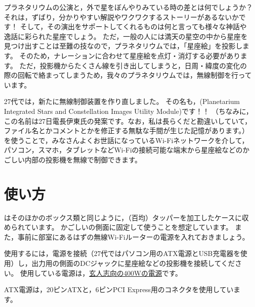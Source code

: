 \documentclass[letterpaper,10pt,dvipdfmx]{sphinxmanual}
\begin{document}
プラネタリウムの公演と，外で星をぼんやりみている時の差とは何でしょうか？
それは，ずばり，分かりやすい解説やワクワクするストーリーがあるないかです！
そして，その演出をサポートしてくれるものは何と言っても様々な神話や逸話に彩られた星座でしょう。
ただ，一般の人には満天の星空の中から星座を見つけ出すことは至難の技なので，プラネタリウムでは，「星座絵」を投影します。
そのため，ナレーションに合わせて星座絵を点灯・消灯する必要があります。
ただ，投影機からたくさん線を引き出してしまうと，日周・緯度の変化の際の回転で絡まってしまうため，我々のプラネタリウムでは，無線制御を行っています。

27代では，新たに無線制御装置を作り直しました。
その名も，(Planetarium Integrated Stars and Constellation
Images Utility Module)です！！
（ちなみに，この名前は27日電長伊東氏の発案です。なお，私は長らくだと勘違いしていて，ファイル名とかコメントとかを修正する無駄な手間が生じた記憶があります。）
を使うことで，みなさんよくお世話になっているWi-Fiネットワークを介して，パソコン，スマホ，タブレットなどWi-Fiの接続可能な端末から星座絵などのかごしい内部の投影機を無線で制御できます。


\section{使い方}
\label{\detokenize{wireless/piscium:id2}}
はそのほかのボックス類と同じように，（百均）タッパーを加工したケースに収められています。
かごしいの側面に固定して使うことを想定しています。
また，事前に部室にあるはずの無線Wi-Fiルーターの電源を入れておきましょう。
\begin{figure}[htbp]
\centering

\noindent{}
\end{figure}

使用するには，電源を接続（27代ではパソコン用のATX電源とUSB充電器を使用）し，出力用の側面のDCジャックに星座絵などの投影機を接続してください。
使用している電源は，\href{http://www.kuroutoshikou.com/product/power/atx/krpw-l5-400w\_80\_/}{玄人志向の400Wの電源}です。
\begin{figure}[htbp]
\centering

\noindent{}
\end{figure}

ATX電源は，20ピンATXと，6ピンPCI Express用のコネクタを使用しています。
\begin{figure}[htbp]
\centering

\noindent{}
\end{figure}
\end{document}
